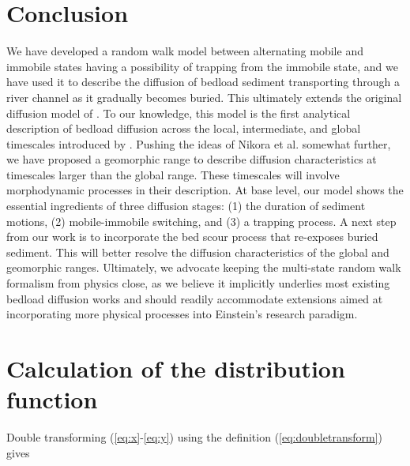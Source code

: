 \documentclass[]{agujournal2018}
\begin{document}
\section{Conclusion}
\label{sec:conclusion}
We have developed a random walk model between alternating mobile and immobile states having a possibility of trapping from the immobile state, and we have used it to describe the diffusion of bedload sediment transporting through a river channel as it gradually becomes buried.
This ultimately extends the original diffusion model of \citet{Einstein1937}.
To our knowledge, this model is the first analytical description of bedload diffusion across the local, intermediate, and global timescales introduced by \citet{Nikora2001a}.
Pushing the ideas of Nikora et al. somewhat further, we have proposed a geomorphic range to describe diffusion characteristics at timescales larger than the global range.
These timescales will involve morphodynamic processes in their description.
At base level, our model shows the essential ingredients of three diffusion stages: (1) the duration of sediment motions, (2) mobile-immobile switching, and (3) a trapping process.
A next step from our work is to incorporate the bed scour process that re-exposes buried sediment. 
This will better resolve the diffusion characteristics of the global and geomorphic ranges.
Ultimately, we advocate keeping the multi-state random walk formalism from physics close, as we believe it implicitly underlies most existing bedload diffusion works and should readily accommodate extensions aimed at incorporating more physical processes into Einstein's research paradigm.

\appendix

\section{Calculation of the distribution function}
\label{sec:appendixA}
Double transforming (\ref{eq:x}-\ref{eq:y}) using the definition (\ref{eq:doubletransform}) gives
\end{document}
